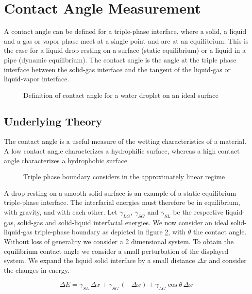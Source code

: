 \section{Contact Angle Measurement}

A contact angle can be defined for a triple-phase interface, where a solid, a liquid and a gas or vapor phase meet at a single point and are at an equilibrium. This is the case for a liquid drop resting on a surface (static equilibrium) or a liquid in a pipe (dynamic equilibrium). The contact angle is the angle at the triple phase interface between the solid-gas interface and the tangent of the liquid-gas or liquid-vapor interface.

\begin{figure}
\centering

\caption{Definition of contact angle for a water droplet on an ideal surface}
\label{fig:contact_angle}
\end{figure}


\subsection{Underlying Theory}

The contact angle is a useful measure of the wetting characteristics of a material. A low contact angle characterizes a hydrophilic surface, whereas a high contact angle characterizes a hydrophobic surface. 

\begin{figure}
\centering

\caption{Triple phase boundary considers in the approximately linear regime}
\label{fig:youngs_eq}
\end{figure}


A drop resting on a smooth solid surface is an example of a static equilibrium triple-phase interface. The interfacial energies must therefore be in equilibrium, with gravity, and with each other. Let $\gamma_{LG}$, $\gamma_{SG}$ and $\gamma_{SL}$ be the respective liquid-gas, solid-gas and solid-liquid interfacial energies. We now consider an ideal solid-liquid-gas triple-phase boundary as depicted in figure \ref{fig:youngs_eq}, with $\theta$ the contact angle. Without loss of generality we consider a 2 dimensional system. To obtain the equilibrium contact angle we consider a small perturbation of the displayed system. We expand the liquid solid interface by a small distance $\Delta x$ and consider the changes in energy.

\begin{equation}
\Delta E = \gamma_{SL}\, \Delta x + \gamma_{SG} \, ( - \Delta x) + \gamma_{LG} \cos{\theta} \, \Delta x
\end{equation}


